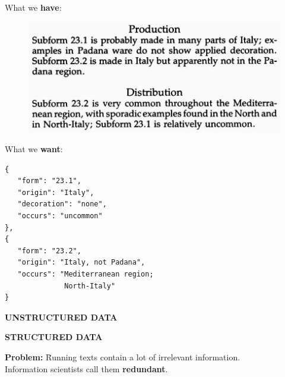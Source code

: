 \documentclass[xcolor=x11names, aspectratio=169]{beamer}
\begin{document}
\begin{frame}[fragile]{}
\begin{minipage}[t]{0.45\textwidth}
What we \textbf{have}:\medskip

\begin{figure}
\includegraphics[width=1.0\textwidth]{img/consp_ex.jpg}
\end{figure}
\end{minipage}\hfill\pause
\begin{minipage}[t]{0.45\textwidth}
What we \textbf{want}:\medskip
{\scriptsize
\begin{verbatim}
{
   "form": "23.1",
   "origin": "Italy",
   "decoration": "none",
   "occurs": "uncommon"
},
{
   "form": "23.2",
   "origin": "Italy, not Padana",
   "occurs": "Mediterranean region;
              North-Italy"
}
\end{verbatim}
}
\end{minipage}\pause\medskip

\begin{minipage}[t]{0.45\textwidth}
\begin{center}
\alert{\textbf{UNSTRUCTURED DATA}}
\end{center}
\end{minipage}\hfill
\begin{minipage}[t]{0.45\textwidth}
\begin{center}
\alert{\textbf{STRUCTURED DATA}}
\end{center}
\end{minipage}

\end{frame}

\begin{frame}
\begin{tabbing}
\qquad\textbf{Problem:} \= Running texts contain a lot of \alert{irrelevant information}.\\[.5em]

\> Information scientists call them \textbf{redundant}.
\end{tabbing}
\end{frame}
\end{document}
